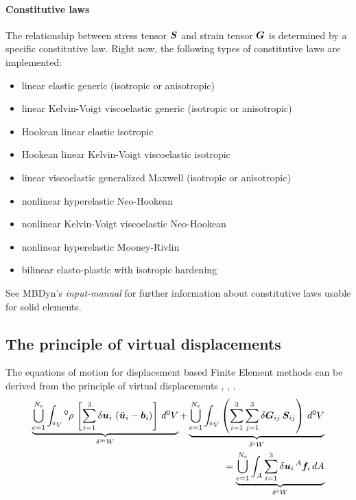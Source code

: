 \paragraph{Constitutive laws}
The relationship between stress tensor $\bm{S}$ and strain tensor $\bm{G}$ is determined by a specific constitutive law.
Right now, the following types of constitutive laws are implemented:
\begin{itemize}
\item linear elastic generic (isotropic or anisotropic)
\item linear Kelvin-Voigt viscoelastic generic (isotropic or anisotropic) \cite{KUEBLER2005}
\item Hookean linear elastic isotropic
\item Hookean linear Kelvin-Voigt viscoelastic isotropic
\item linear viscoelastic generalized Maxwell (isotropic or anisotropic) \cite{bleyer2018numericaltours}
\item nonlinear hyperelastic Neo-Hookean \cite{KUEBLER2005}
\item nonlinear Kelvin-Voigt viscoelastic Neo-Hookean \cite{KUEBLER2005}
\item nonlinear hyperelastic Mooney-Rivlin \cite{BATHE2016}
\item bilinear elasto-plastic with isotropic hardening \cite{BATHE2016}
\end{itemize}
See MBDyn's \emph{input-manual} for further information about constitutive laws usable for solid elements.

\subsection{The principle of virtual displacements}
The equations of motion for displacement based Finite Element methods can be derived from the principle of virtual displacements \cite{WALLRAPP1998}, \cite{BATHE2016}, \cite{KUEBLER2005}.
\begin{eqnarray}
\underbrace{\bigcup_{e=1}^{N_e}\int_{^0V} {^0}\rho \, \left[\sum_{i=1}^3 \delta\bm{u}_i\,\left(\ddot{\bm{u}}_i - \bm{b}_i\right) \right]\, d^0V}_{\delta ^mW} + \underbrace{\bigcup_{e=1}^{N_e}\int_{^0V} \left(\sum_{i=1}^3\sum_{j=1}^3 \delta\bm{G}_{ij}\,\bm{S}_{ij} \right) \, d^0V}_{\delta^iW} \nonumber \\
= \underbrace{\bigcup_{e=1}^{N_e}\int_{A} \sum_{i=1}^3 \delta\bm{u}_i\,^A\bm{f}_i \,dA}_{\delta^eW} \label{eq:solid:pdVA}
\end{eqnarray}

